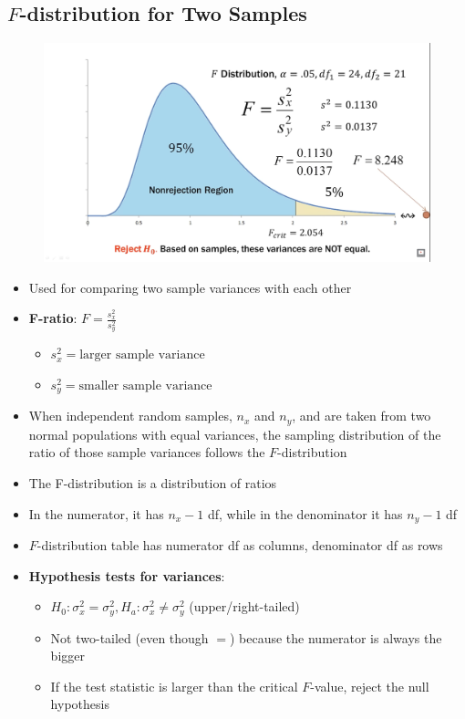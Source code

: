 \documentclass{article}
\begin{document}
\subsection{$F$-distribution for Two Samples}

\begin{figure}[H]
    \centering
    \includegraphics[width=1.0\linewidth]{images/ftestexample.png}
\end{figure}

\begin{itemize}
    \item Used for comparing two sample variances with each other
    \item \textbf{F-ratio}: $F=\frac{s_x^2}{s_y^2}$
    \begin{itemize}
        \item $s_x^2=\text{larger sample variance}$
        \item $s_y^2=\text{smaller sample variance}$
    \end{itemize}
    \item When independent random samples, $n_x$ and $n_y$, and are taken from two normal populations with equal variances, the sampling distribution of the ratio of those sample variances follows the $F$-distribution 
    \item The F-distribution is a distribution of ratios
    \item In the numerator, it has $n_x-1$ df, while in the denominator it has $n_y-1$ df
    \item $F$-distribution table has numerator df as columns, denominator df as rows
    \item \textbf{Hypothesis tests for variances}:
    \begin{itemize}
        \item $H_0: \sigma_x^2=\sigma_y^2, H_a: \sigma_x^2\ne \sigma_y^2$ (upper/right-tailed)
        \item Not two-tailed (even though $=$) because the numerator is always the bigger
        \item If the test statistic is larger than the critical $F$-value, reject the null hypothesis
    \end{itemize}
\end{itemize}
\end{document}
